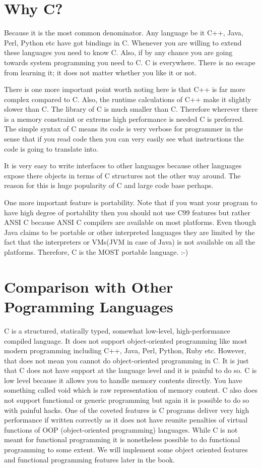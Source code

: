 \section{Why C?}
Because it is the most common denominator. Any language be it C++, Java, Perl,
Python etc have got bindings in C. Whenever you are willing to extend these
languages you need to know C. Also, if by any chance you are going towards
system programming you need to C. C is everywhere. There is no escape from
learning it; it does not matter whether you like it or not.

There is one more important point worth noting here is that C++ is far more
complex compared to C. Also, the runtime calculations of C++ make it slightly
slower than C. The library of C is much smaller than C. Therefore wherever
there is a memory constraint or extreme high performance is needed C is
preferred. The simple syntax of C means its code is very verbose for programmer
in the sense that if you read code then you can very easily see what
instructions the code is going to translate into.

It is very easy to write interfaces to other languages because other languages
expose there objects in terms of C structures not the other way around. The
reason for this is huge popularity of C and large code base perhaps.

One more important feature is portability. Note that if you want your program
to have high degree of portability then you should not use C99 features but
rather ANSI C because ANSI C compilers are available on most platforms. Even
though Java claims to be portable or other interpreted languages they are
limited by the fact that the interpreters or VMs(JVM in case of Java) is not
available on all the platforms. Therefore, C is the MOST portable language. :-)

\section{Comparison with Other Pogramming Languages}
C is a structured, statically typed, somewhat low-level, high-performance
compiled language. It does not support object-oriented programming like most
modern programming including C++, Java, Perl, Python, Ruby etc. However, that
does not mean you cannot do object-oriented programming in C. It is just that C
does not have support at the language level and it is painful to do so. C is
low level because it allows you to handle memory contents directly. You have
something called void which is raw representation of memory content. C also
does not support functional or generic programming but again it is possible to
do so with painful hacks. One of the coveted features is C programs deliver
very high performance if written correctly as it does not have reunite
penalties of virtual functions of OOP (object-oriented programming) languages.
While C is not meant for functional programming it is nonetheless possible to
do functional programming to some extent. We will implement some object oriented
features and functional programming features later in the book.

